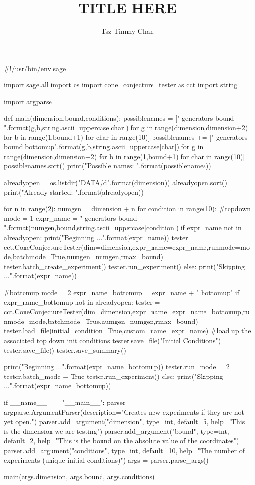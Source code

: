\documentclass{TC}
\title{TITLE HERE}	%
\author{Tsz Timmy Chan}	%
\begin{document}
\begin{SAGE}
#!/usr/bin/env sage

import sage.all
import os
import cone_conjecture_tester as cct
import string

import argparse

def main(dimension,bound,conditions):
	possiblenames = ["{} generators {} bound {}".format(g,b,string.ascii_uppercase[char]) for g in range(dimension,dimension+2) 
		for b in range(1,bound+1)
		for char in range(10)] 
	possiblenames += ["{} generators {} bound {} bottomup".format(g,b,string.ascii_uppercase[char]) for g in range(dimension,dimension+2) for b in range(1,bound+1) for char in range(10)] 
	possiblenames.sort()
	print("Possible names: \n{}".format(possiblenames))

	alreadyopen = os.listdir("DATA/{}d".format(dimension))
	alreadyopen.sort()
	print("Already started: \n{}".format(alreadyopen))

	for n in range(2):
		numgen = dimension + n 
		for condition in range(10):
			#topdown
			mode = 1
			expr_name = "{} generators {} bound {}".format(numgen,bound,string.ascii_uppercase[condition])
			if expr_name not in alreadyopen:
				print("Beginning {}...".format(expr_name))
				tester = cct.ConeConjectureTester(dim=dimension,expr_name=expr_name,runmode=mode,batchmode=True,numgen=numgen,rmax=bound)
				tester.batch_create_experiment()
				tester.run_experiment()
			else:
				print("Skipping {}...".format(expr_name))
				
			#bottomup
			mode = 2
			expr_name_bottomup = expr_name + " bottomup"
			if expr_name_bottomup not in alreadyopen:
				tester = cct.ConeConjectureTester(dim=dimension,expr_name=expr_name_bottomup,runmode=mode,batchmode=True,numgen=numgen,rmax=bound)
				tester.load_file(initial_condition=True,custom_name=expr_name) #load up the associated top down init conditions
				tester.save_file("Initial Conditions")
				tester.save_file()
				tester.save_summary()

				print("Beginning {}...".format(expr_name_bottomup))
				tester.run_mode = 2
				tester.batch_mode = True
				tester.run_experiment()
			else:
				print("Skipping {}...".format(expr_name_bottomup))

if __name__ == "__main__":
	parser = argparse.ArgumentParser(description="Creates new experiments if they are not yet open.")
	parser.add_argument("dimension", type=int, default=5, help="This is the dimension we are testing")
	parser.add_argument("bound", type=int, default=2, help="This is the bound on the absolute value of the coordinates")
	parser.add_argument("conditions", type=int, default=10, help="The number of experiments (unique initial conditions)")
	args = parser.parse_args()

	main(args.dimension, args.bound, args.conditions)

\end{SAGE}
\end{document}
